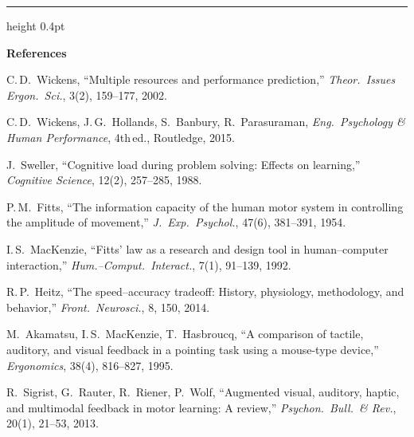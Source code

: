 \documentclass[12pt,letterpaper]{article}
\begin{document}
\vspace{1em}
{\color{accent}\hrule height 0.4pt}
\vspace{0.1em}
{\scriptsize\setlength{\parskip}{0pt}%
\textbf{References}\par\vspace{-0.2em}
\begin{enumerate}[label={[\arabic*]},leftmargin=1.5em,itemsep=0pt,parsep=0pt,topsep=0pt]
  \item C.\,D.\ Wickens, ``Multiple resources and performance prediction,'' \emph{Theor.\ Issues Ergon.\ Sci.}, 3(2), 159--177, 2002.
  \item C.\,D.\ Wickens, J.\,G.\ Hollands, S.\ Banbury, R.\ Parasuraman, \emph{Eng.\ Psychology \& Human Performance}, 4th\,ed., Routledge, 2015.
  \item J.\ Sweller, ``Cognitive load during problem solving: Effects on learning,'' \emph{Cognitive Science}, 12(2), 257--285, 1988.
  \item P.\,M.\ Fitts, ``The information capacity of the human motor system in controlling the amplitude of movement,'' \emph{J.\ Exp.\ Psychol.}, 47(6), 381--391, 1954.
  \item I.\,S.\ MacKenzie, ``Fitts' law as a research and design tool in human--computer interaction,'' \emph{Hum.--Comput.\ Interact.}, 7(1), 91--139, 1992.
  \item R.\,P.\ Heitz, ``The speed--accuracy tradeoff: History, physiology, methodology, and behavior,'' \emph{Front.\ Neurosci.}, 8, 150, 2014.
  \item M.\ Akamatsu, I.\,S.\ MacKenzie, T.\ Hasbroucq, ``A comparison of tactile, auditory, and visual feedback in a pointing task using a mouse-type device,'' \emph{Ergonomics}, 38(4), 816--827, 1995.
  \item R.\ Sigrist, G.\ Rauter, R.\ Riener, P.\ Wolf, ``Augmented visual, auditory, haptic, and multimodal feedback in motor learning: A review,'' \emph{Psychon.\ Bull.\ \& Rev.}, 20(1), 21--53, 2013.
\end{enumerate}
}
\end{document}
